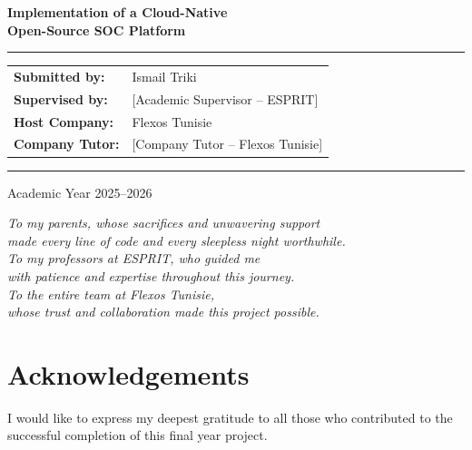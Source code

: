\documentclass[12pt,a4paper]{report}
\begin{document}
\begin{titlepage}
\begin{center}
{\Huge\bfseries\color{espritblue}
Implementation of a Cloud-Native\\[0.3cm]
Open-Source SOC Platform}

\vspace{0.3cm}
\textcolor{espritblue}{\rule{\linewidth}{2pt}}

\vspace{0.7cm}
\begin{tabular}{ll}
\textbf{Submitted by:}   & Ismail Triki \\[0.2cm]
\textbf{Supervised by:}  & [Academic Supervisor -- ESPRIT] \\[0.2cm]
\textbf{Host Company:}   & Flexos Tunisie \\[0.2cm]
\textbf{Company Tutor:}  & [Company Tutor -- Flexos Tunisie] \\[0.2cm]
\end{tabular}

\vfill
\textcolor{espritblue}{\rule{\linewidth}{3pt}}
{\normalsize Academic Year 2025--2026}
\end{center}
\end{titlepage}

\newpage\thispagestyle{empty}
\vspace*{5cm}
\begin{center}
{\large\itshape\color{espritgray}
To my parents, whose sacrifices and unwavering support\\
made every line of code and every sleepless night worthwhile.\\[0.5cm]
To my professors at ESPRIT, who guided me\\
with patience and expertise throughout this journey.\\[0.5cm]
To the entire team at Flexos Tunisie,\\
whose trust and collaboration made this project possible.
}
\end{center}
\vfill

\newpage\thispagestyle{empty}
\chapter*{Acknowledgements}

I would like to express my deepest gratitude to all those who contributed to the successful completion of this final year project.
\end{document}
